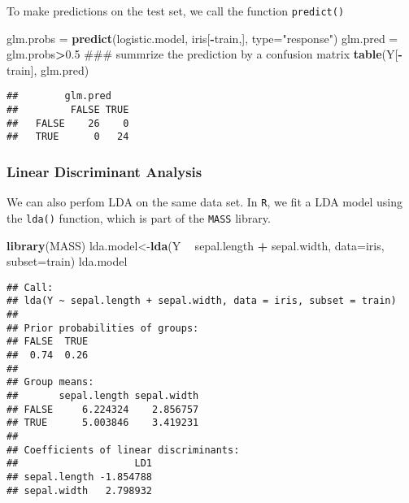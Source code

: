 \documentclass[]{article}
\newenvironment{Shaded}{\begin{snugshade}}{\end{snugshade}}
\newcommand{\KeywordTok}[1]{\textcolor[rgb]{0.13,0.29,0.53}{\textbf{#1}}}
\newcommand{\DataTypeTok}[1]{\textcolor[rgb]{0.13,0.29,0.53}{#1}}
\newcommand{\FloatTok}[1]{\textcolor[rgb]{0.00,0.00,0.81}{#1}}
\newcommand{\StringTok}[1]{\textcolor[rgb]{0.31,0.60,0.02}{#1}}
\newcommand{\OperatorTok}[1]{\textcolor[rgb]{0.81,0.36,0.00}{\textbf{#1}}}
\newcommand{\NormalTok}[1]{#1}
\begin{document}
To make predictions on the test set, we call the function
\texttt{predict()}

\begin{Shaded}
\begin{Highlighting}[]
\NormalTok{glm.probs =}\StringTok{ }\KeywordTok{predict}\NormalTok{(logistic.model, iris[}\OperatorTok{-}\NormalTok{train,], }\DataTypeTok{type=}\StringTok{"response"}\NormalTok{)}
\NormalTok{glm.pred =}\StringTok{ }\NormalTok{glm.probs}\OperatorTok{>}\FloatTok{0.5}
\NormalTok{### summrize the prediction by a confusion matrix}
\KeywordTok{table}\NormalTok{(Y[}\OperatorTok{-}\NormalTok{train], glm.pred)}
\end{Highlighting}
\end{Shaded}

\begin{verbatim}
##        glm.pred
##         FALSE TRUE
##   FALSE    26    0
##   TRUE      0   24
\end{verbatim}

\subsubsection{Linear Discriminant
Analysis}\label{linear-discriminant-analysis}

We can also perfom LDA on the same data set. In \texttt{R}, we fit a LDA
model using the \texttt{lda()} function, which is part of the
\texttt{MASS} library.

\begin{Shaded}
\begin{Highlighting}[]
\KeywordTok{library}\NormalTok{(MASS)}
\NormalTok{lda.model<-}\KeywordTok{lda}\NormalTok{(Y }\OperatorTok{~}\StringTok{ }\NormalTok{sepal.length }\OperatorTok{+}\StringTok{ }\NormalTok{sepal.width, }\DataTypeTok{data=}\NormalTok{iris, }\DataTypeTok{subset=}\NormalTok{train)}
\NormalTok{lda.model}
\end{Highlighting}
\end{Shaded}

\begin{verbatim}
## Call:
## lda(Y ~ sepal.length + sepal.width, data = iris, subset = train)
## 
## Prior probabilities of groups:
## FALSE  TRUE 
##  0.74  0.26 
## 
## Group means:
##       sepal.length sepal.width
## FALSE     6.224324    2.856757
## TRUE      5.003846    3.419231
## 
## Coefficients of linear discriminants:
##                    LD1
## sepal.length -1.854788
## sepal.width   2.798932
\end{verbatim}
\end{document}
